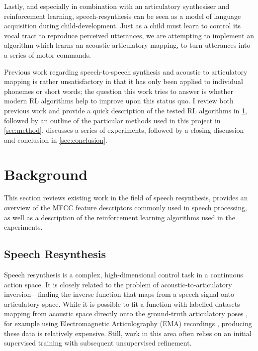 \documentclass[letterpaper,10pt,conference]{ieeeconf}
\begin{document}
Lastly, and especially in combination with an articulatory synthesiser and reinforcement learning, speech-resynthesis can be seen as a model of language acquisition during child-development. Just as a child must learn to control its vocal tract to reproduce perceived utterances, we are attempting to implement an algorithm which learns an acoustic-articulatory mapping, to turn utterances into a series of motor commands.

Previous work regarding speech-to-speech synthesis and acoustic to articulatory mapping is rather unsatisfactory in that it has only been applied to individual phonemes or short words; the question this work tries to answer is whether modern RL algorithms help to improve upon this status quo. I review both previous work and provide a quick description of the tested RL algorithms in \cref{sec:background}, followed by an outline of the particular methods used in this project in \cref{sec:method}.  discusses a series of experiments, followed by a closing discussion and conclusion in \cref{sec:conclusion}.

\section{Background}
\label{sec:background}

This section reviews existing work in the field of speech resynthesis, provides an overview of the MFCC feature descriptors commonly used in speech processing, as well as a description of the reinforcement learning algorithms used in the experiments.

\subsection{Speech Resynthesis}

Speech resynthesis is a complex, high-dimensional control task in a continuous action space. It is closely related to the problem of acoustic-to-articulatory inversion---finding the inverse function that maps from a speech signal onto articulatory space. While it is possible to fit a function with labelled datasets mapping from acoustic space directly onto the ground-truth articulatory poses \cite{uria2011deep}, for example using Electromagnetic Articulography (EMA) recordings \cite{birkholz2007control}, producing these data is relatively expensive. Still, work in this area often relies on an initial supervised training with subsequent unsupervised refinement. 
\end{document}
